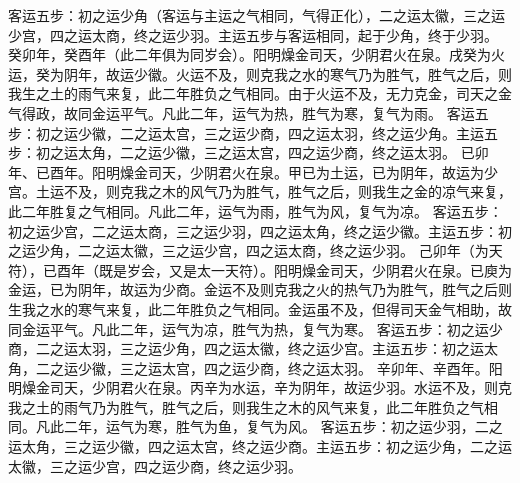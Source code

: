 \documentclass[12pt,UTF8]{ctexbook}
\begin{document}
客运五步：初之运少角（客运与主运之气相同，气得正化），二之运太徽，三之运少宫，四之运太商，终之运少羽。主运五步与客运相同，起于少角，终于少羽。
癸卯年，癸酉年（此二年俱为同岁会）。阳明燥金司天，少阴君火在泉。戌癸为火运，癸为阴年，故运少徽。火运不及，则克我之水的寒气乃为胜气，胜气之后，则我生之土的雨气来复，此二年胜负之气相同。由于火运不及，无力克金，司天之金气得政，故同金运平气。凡此二年，运气为热，胜气为寒，复气为雨。
客运五步：初之运少徽，二之运太宫，三之运少商，四之运太羽，终之运少角。主运五步：初之运太角，二之运少徽，三之运太宫，四之运少商，终之运太羽。
已卯年、已酉年。阳明燥金司天，少阴君火在泉。甲已为土运，已为阴年，故运为少宫。土运不及，则克我之木的风气乃为胜气，胜气之后，则我生之金的凉气来复，此二年胜复之气相同。凡此二年，运气为雨，胜气为风，复气为凉。
客运五步：初之运少宫，二之运太商，三之运少羽，四之运太角，终之运少徽。主运五步：初之运少角，二之运太徽，三之运少宫，四之运太商，终之运少羽。
己卯年（为天符），已酉年（既是岁会，又是太一天符）。阳明燥金司天，少阴君火在泉。已庾为金运，已为阴年，故运为少商。金运不及则克我之火的热气乃为胜气，胜气之后则生我之水的寒气来复，此二年胜负之气相同。金运虽不及，但得司天金气相助，故同金运平气。凡此二年，运气为凉，胜气为热，复气为寒。
客运五步：初之运少商，二之运太羽，三之运少角，四之运太徽，终之运少宫。主运五步：初之运太角，二之运少徽，三之运太宫，四之运少商，终之运太羽。
辛卯年、辛酉年。阳明燥金司天，少阴君火在泉。丙辛为水运，辛为阴年，故运少羽。水运不及，则克我之土的雨气乃为胜气，胜气之后，则我生之木的风气来复，此二年胜负之气相同。凡此二年，运气为寒，胜气为鱼，复气为风。
客运五步：初之运少羽，二之运太角，三之运少徽，四之运太宫，终之运少商。主运五步：初之运少角，二之运太徽，三之运少宫，四之运少商，终之运少羽。
\end{document}
